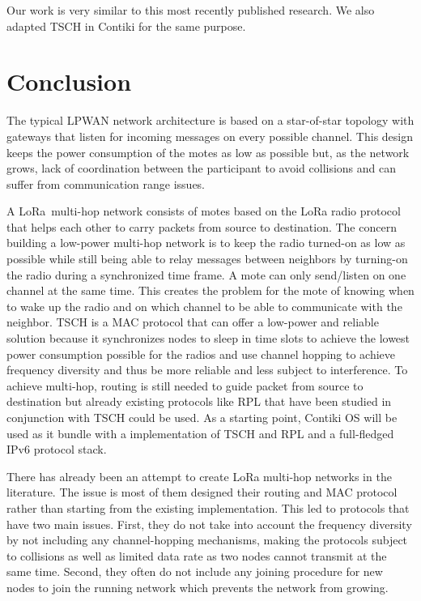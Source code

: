 Our work is very similar to this most recently published research.
We also adapted TSCH in Contiki for the same purpose.


\section{Conclusion}

The typical LPWAN network architecture is based on a star-of-star topology
with gateways that listen for incoming messages on every possible channel.
This design keeps the power consumption of the motes as low as possible
but, as the network grows, lack of coordination between the participant to avoid
collisions and can suffer from communication range issues.

A LoRa multi-hop network consists of motes based on the LoRa radio protocol
that helps each other to carry packets from source to destination.
The concern building a low-power multi-hop network is to keep
the radio turned-on as low as possible while still being able to relay
messages between neighbors by turning-on the radio during a synchronized time frame.
A mote can only send/listen on one channel at the same time.
This creates the problem for the mote of knowing when to wake up the radio and
on which channel to be able to communicate with the neighbor.
TSCH is a MAC protocol that
can offer a low-power and reliable solution because it synchronizes nodes
to sleep in time slots to achieve the lowest power consumption possible for the
radios and use channel hopping to achieve frequency diversity and thus be
more reliable and less subject to interference.
To achieve multi-hop, routing is still needed to guide packet from source
to destination but already existing protocols like RPL that have been studied
in conjunction with TSCH could be used.
As a starting point, Contiki OS will be used as it bundle with a
implementation of TSCH and RPL and a full-fledged IPv6 protocol stack.

There has already been an attempt to create LoRa multi-hop networks in the
literature. The issue is most of them designed their routing and MAC protocol
rather than starting from the existing implementation.
This led to protocols that have two main issues.
First, they do not take into account the frequency diversity by
not including any channel-hopping mechanisms, making the protocols subject to
collisions as well as limited data rate as two nodes cannot transmit at the same time.
Second, they often do not include any joining procedure
for new nodes to join the running network which prevents the network from growing.
